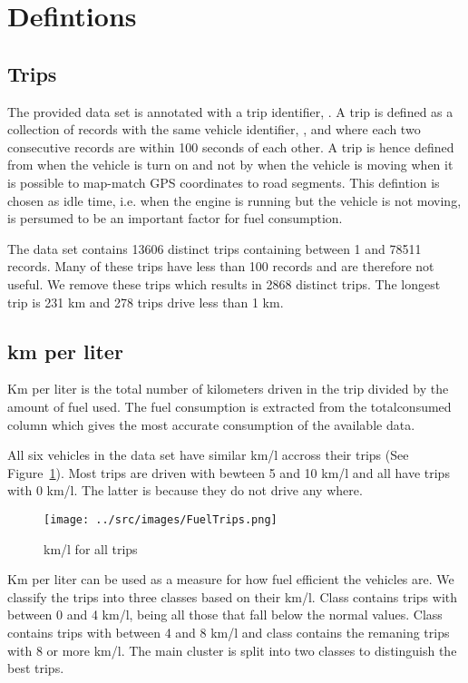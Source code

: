 \section{Defintions}
\subsection{Trips}
The provided data set is annotated with a trip identifier, \tid.
A trip is defined as a collection of records with the same vehicle identifier, \vid, and where each two consecutive records are within 100 seconds of each other.
A trip is hence defined from when the vehicle is turn on and not by when the vehicle is moving when it is possible to map-match GPS coordinates to road segments. 
This defintion is chosen as idle time, i.e. when the engine is running but the vehicle is not moving, is persumed to be an important factor for fuel consumption. 


The data set contains 13606 distinct trips containing between 1 and 78511 records.
Many of these trips have less than 100 records and are therefore not useful. %
We remove these trips which results in 2868 distinct trips. 
The longest trip is 231 km and 278 trips drive less than 1 km.

\subsection{km per liter}
Km per liter is the total number of kilometers driven in the trip divided by the amount of fuel used.
The fuel consumption is extracted from the totalconsumed column which gives the most accurate consumption of the available data.

All six vehicles in the data set have similar km/l accross their trips (See Figure~\ref{fig:kmlTrips}).
Most trips are driven with bewteen 5 and 10 km/l and all have trips with 0 km/l. The latter is because they do not drive any where.
\begin{figure}[htb]
\centering
\texttt{[image: ../src/images/FuelTrips.png]}
\caption{km/l for all trips}
\label{fig:kmlTrips}
\end{figure}

Km per liter can be used as a measure for how fuel efficient the vehicles are.
We classify the trips into three classes based on their km/l.
Class \fuelLow contains trips with between 0 and 4 km/l, being all those that fall below the normal values.
Class \fuelMedium contains trips with between 4 and 8 km/l and class \fuelHigh contains the remaning trips with 8 or more km/l.
The main cluster is split into two classes to distinguish the best trips.